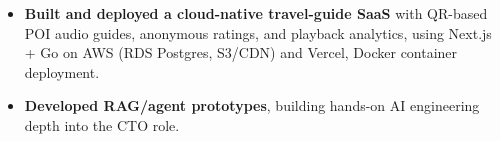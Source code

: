 \documentclass{resume-v2}
\begin{document}
\begin{itemize}
  \item \textbf{Built and deployed a cloud-native travel-guide SaaS} with QR-based POI audio guides, anonymous ratings, and playback analytics, using Next.js + Go on AWS (RDS Postgres, S3/CDN) and Vercel, Docker container deployment.
  \item \textbf{Developed RAG/agent prototypes}, building hands-on AI engineering depth into the CTO role.
\end{itemize}
\end{document}
